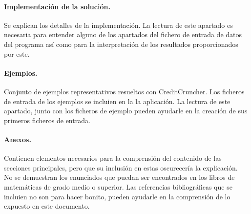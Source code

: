 \paragraph{Implementaci\'on de la soluci\'on.} Se explican los detalles de
la implementaci\'on. La lectura de este apartado es necesaria para entender 
alguno de los apartados del fichero de entrada de datos del programa as\'i como 
para la interpretaci\'on de los resultados proporcionados por este.

\paragraph{Ejemplos.} Conjunto de ejemplos representativos resueltos con
CreditCruncher. Los ficheros de entrada de los ejemplos se incluien en la
la aplicaci\'on. La lectura de este apartado, junto con los ficheros de ejemplo 
pueden ayudarle en la creaci\'on de sus primeros ficheros de entrada.

\paragraph{Anexos.} Contienen elementos necesarios para la comprensi\'on del 
contenido de las secciones principales, pero que su inclusi\'on en estas 
oscurecer\'ia la explicaci\'on. \\

No se demuestran los enunciados que puedan ser encontrados
en los libros de matem\'aticas de grado medio o superior. Las referencias 
bibliogr\'aficas que se incluien no son para hacer bonito, pueden ayudarle en
la comprensi\'on de lo expuesto en este documento.


